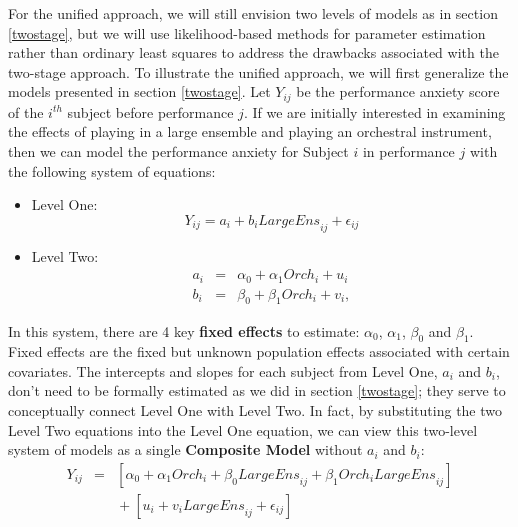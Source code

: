 \documentclass[
]{krantz}
\providecommand{\tightlist}{%
  \setlength{\itemsep}{0pt}\setlength{\parskip}{0pt}}
\begin{document}
For the unified approach, we will still envision two levels of models as in section \ref{twostage}, but we will use likelihood-based methods for parameter estimation rather than ordinary least squares to address the drawbacks associated with the two-stage approach. To illustrate the unified approach, we will first generalize the models presented in section \ref{twostage}. Let \(Y_{ij}\) be the performance anxiety score of the \(i^{th}\) subject before performance \(j\). If we are initially interested in examining the effects of playing in a large ensemble and playing an orchestral instrument, then we can model the performance anxiety for Subject \(i\) in performance \(j\) with the following system of equations:

\begin{itemize}
\tightlist
\item
  Level One:
  \begin{equation}
  Y_{ij} = a_{i}+b_{i}\textstyle{LargeEns}_{ij}+\epsilon_{ij}
  \label{eq:level1large}
  \end{equation}
\item
  Level Two:
  \begin{eqnarray*}
  a_{i} & = & \alpha_{0}+\alpha_{1}\textstyle{Orch}_{i}+u_{i} \\
  b_{i} & = & \beta_{0}+\beta_{1}\textstyle{Orch}_{i}+v_{i},
  \end{eqnarray*}
\end{itemize}

In this system, there are 4 key \textbf{fixed effects} to estimate: \(\alpha_{0}\), \(\alpha_{1}\), \(\beta_{0}\) and \(\beta_{1}\). Fixed effects are the fixed but unknown population effects associated with certain covariates. The intercepts and slopes for each subject from Level One, \(a_{i}\) and \(b_{i}\), don't need to be formally estimated as we did in section \ref{twostage}; they serve to conceptually connect Level One with Level Two. In fact, by substituting the two Level Two equations into the Level One equation, we can view this two-level system of models as a single \textbf{Composite Model} without \(a_{i}\) and \(b_{i}\):
\begin{eqnarray*}
Y_{ij} & = & [\alpha_{0}+\alpha_{1}\textstyle{Orch}_{i}+\beta_{0}\textstyle{LargeEns}_{ij}+\beta_{1}\textstyle{Orch}_{i}\textstyle{LargeEns}_{ij}] \\
 & & \textrm{} + [u_{i}+v_{i}\textstyle{LargeEns}_{ij}+\epsilon_{ij}]
\end{eqnarray*}
\end{document}
